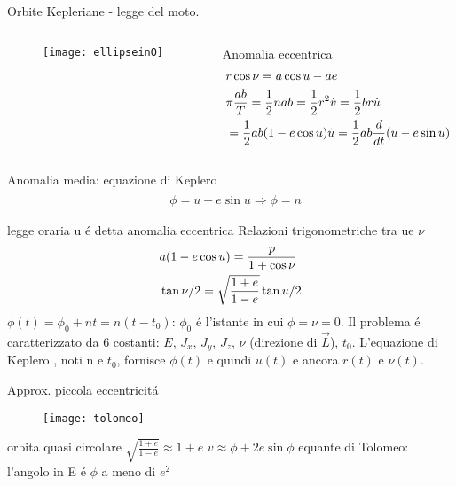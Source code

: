 \begin{frame}{Orbite Kepleriane - legge del moto.}
\begin{columns}
\begin{column}{0.2\textwidth}
\begin{figure}[!ht]
\texttt{[image: ellipseinO]}
\end{figure}
\end{column}
\begin{column}{0.8\textwidth}
\begin{block}{Anomalia eccentrica}
\begin{align*}
&r\cos{\nu}=a\cos{u}-ae\\
&\pi\frac{ab}{T}=\frac{1}{2}nab=\frac{1}{2}r^2\dot{v}=\frac{1}{2}br\dot{u}\\
&=\frac{1}{2}ab(1-e\cos{u})\dot{u}=\frac{1}{2}ab\frac{d}{d t}(u-e\sin{u})
\end{align*}
\end{block}
\end{column}
\end{columns}
\begin{block}{Anomalia media: equazione di Keplero}
\begin{align*}\label{eq:Keq}
&\phi=u-e\sin{u}\Rightarrow\dot{\phi}=n
\end{align*}
\end{block}
\end{frame}

\begin{wordonframe}{legge oraria}
u \'e detta anomalia eccentrica
Relazioni trigonometriche tra ue $\nu$
\begin{align*}
&a(1-e\cos{u})=\frac{p}{1+\cos{\nu}}\\
&\operatorname{tan}{\nu/2}=\sqrt{\frac{1+e}{1-e}}\operatorname{tan}{u/2}
\end{align*}
$\phi(t)=\phi_0+nt=n(t-t_0)$: $\phi_0$ \'e l'istante in cui $\phi=\nu=0$.
Il problema \'e caratterizzato da 6 costanti: $E$, $J_x$, $J_y$, $J_z$, $\nu$ (direzione di $\vec{L}$), $t_0$.
L'equazione di Keplero , noti n e $t_0$, fornisce $\phi(t)$ e quindi $u(t)$ e ancora $r(t)$ e $\nu(t)$.
\end{wordonframe}

\begin{frame}{Approx. piccola eccentricit\'a}
\begin{figure}[!ht]
\texttt{[image: tolomeo]}
\end{figure}
\end{frame}

\begin{wordonframe}{orbita quasi circolare}
$\sqrt{\frac{1+e}{1-e}}\approx1+e$
$v\approx\phi+2e\sin{\phi}$
equante di Tolomeo: l'angolo in E \'e $\phi$ a meno di $e^2$
\end{wordonframe}
